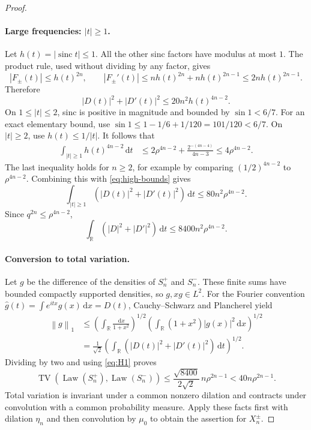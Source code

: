 \documentclass[11pt,a4paper]{article}
\theoremstyle{definition}
\theoremstyle{remark}
\DeclareMathOperator{\TV}{TV}
\DeclareMathOperator{\Law}{Law}
\DeclareMathOperator{\sinc}{sinc}
\newcommand{\R}{\mathbb R}
\newcommand{\dd}{\,\mathrm d}
\newcommand{\norm}[1]{\left\lVert #1\right\rVert}
\begin{document}
\begin{proof}
\paragraph{Large frequencies: $|t|\ge1$.}
Let $h(t)=|\sinc t|\le1$. All the other sinc factors have modulus at
most $1$. The product rule, used without dividing by any factor, gives
\[
 |F_\pm(t)|\le h(t)^{2n},\qquad
 |F_\pm'(t)|\le n h(t)^{2n}+n h(t)^{2n-1}
                     \le2n h(t)^{2n-1}.
\]
Therefore
\begin{equation}\label{eq:high-bounds}
 |D(t)|^2+|D'(t)|^2\le20n^2h(t)^{4n-2}.
\end{equation}
On $1\le |t|\le2$, sinc is positive in magnitude and bounded by
$\sin1<6/7$. For an exact elementary bound, use
$\sin1\le1-1/6+1/120=101/120<6/7$.
On $|t|\ge2$, use $h(t)\le1/|t|$. It follows that
\begin{align*}
 \int_{|t|\ge1}h(t)^{4n-2}\dd t
 &\le2\rho^{4n-2}
             +\frac{2^{-(4n-4)}}{4n-3}
 \le4\rho^{4n-2}.
\end{align*}
The last inequality holds for $n\ge2$, for example by comparing
$(1/2)^{4n-2}$ to $\rho^{4n-2}$. Combining this with
\eqref{eq:high-bounds} gives
\begin{equation}\label{eq:high-int}
 \int_{|t|\ge1}(|D(t)|^2+|D'(t)|^2)\dd t
       \le80n^2\rho^{4n-2}.
\end{equation}
Since $q^{2n}\le\rho^{4n-2}$,
\begin{equation}\label{eq:H1}
 \int_\R(|D|^2+|D'|^2)\dd t
       \le8400n^2\rho^{4n-2}.
\end{equation}

\paragraph{Conversion to total variation.}
Let $g$ be the difference of the densities of $S_n^+$ and $S_n^-$. These
finite sums have bounded compactly supported densities, so $g,xg\in L^2$.
For the Fourier convention $\widehat g(t)=\int e^{itx}g(x)\dd x=D(t)$,
Cauchy--Schwarz and Plancherel yield
\begin{align*}
 \norm{g}_1
 &\le\left(\int_\R\frac{\dd x}{1+x^2}\right)^{1/2}
       \left(\int_\R(1+x^2)|g(x)|^2\dd x\right)^{1/2}\\
 &=\frac1{\sqrt2}
       \left(\int_\R(|D(t)|^2+|D'(t)|^2)\dd t\right)^{1/2}.
\end{align*}
Dividing by two and using \eqref{eq:H1} proves
\[
 \TV(\Law(S_n^+),\Law(S_n^-))
 \le\frac{\sqrt{8400}}{2\sqrt2}\,n\rho^{2n-1}
 <40n\rho^{2n-1}.
\]
Total variation is invariant under a common nonzero dilation and contracts
under convolution with a common probability measure. Apply these facts
first with dilation $\eta_n$ and then convolution by $\mu_0$ to obtain
the assertion for $X_n^\pm$.
\end{proof}
\end{document}
